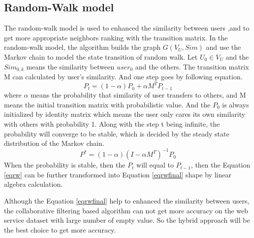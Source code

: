 \documentclass[conference]{IEEEtran}
\begin{document}
\subsection{Random-Walk model}
\par The random-walk model\cite{yin_network_2017} is used to enhanced the similarity between users ,and to get more appropriate neighbors ranking with the transition matrix. In the random-walk model, the algorithm builds the graph $G(V_{U},Sim)$ and use the Markov chain to model the state transition of random walk. Let $U_{0} \in V_{U}$ and the $Sim_{0,k}$ means the similarity between $user_{0}$ and the others. The transition matrix M can calculated by user's similarity. And one step goes by following equation.
\begin{equation}
P_{t}=(1-\alpha)P_{0}+ \alpha M^{T}P_{t-1} 
\label{eqrw}
\end{equation}
where $\alpha$ means the probability that similarity of user transfers to others, and M means the initial transition matrix with probabilistic value. And the $P_{0}$ is always initialized by identity matrix which means the user only cares its own similarity with others with probability 1. Along with the step t being infinite, the probability will converge to be stable, which is decided by the steady state distribution of the Markov chain. 
\begin{equation}
P^{*}=(1-\alpha)(I-\alpha M^{T})^{-1}P_{0}
\label{eqrwfinal}
\end{equation} 
When the probability is stable, then the $P_{t}$ will equal to $P_{t-1}$, then the Equation \ref{eqrw} can be further transformed into Equation \ref{eqrwfinal} shape by linear algebra calculation. 
\par Although the Equation \ref{eqrwfinal} help to enhanced the similarity between users, the collaborative filtering based algorithm can not get more accuracy on the web service dataset with large number of empty value. So the hybrid approach will be the best choice to get more accuracy.
\end{document}

